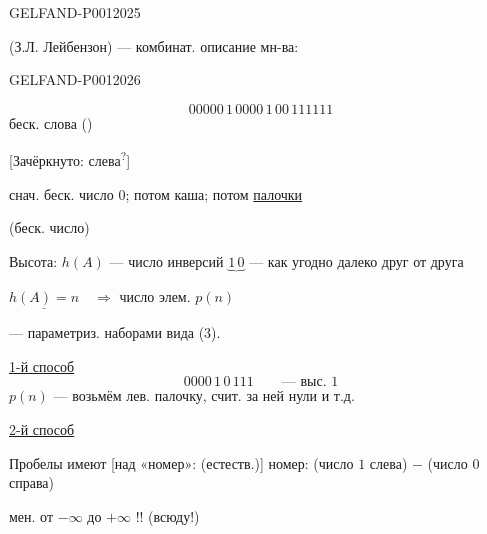 \begin{GelfandAdjacentEvidence}{GELFAND-P001202}{5}

(З.Л. Лейбензон) --- комбинат. описание мн-ва:
\end{GelfandAdjacentEvidence}
\begin{GelfandAdjacentEvidence}{GELFAND-P001202}{6}

\[
00000\,1\,0000\,1\,00\,111111
\]
беск. слова ()

[Зачёркнуто: слева\textsuperscript{?}]
\end{GelfandAdjacentEvidence}

снач. беск. число $0$; потом каша; потом \underline{палочки}

(беск. число)

Высота: $h(A)$ --- число инверсий $\underbrace{1\,0}$ --- как угодно далеко друг от друга

$\underline{h(A)=n}\quad\Rightarrow$ число элем. $p(n)$

--- параметриз. наборами вида (3).

\underline{1-й способ}
\[
0000\,1\,0\,111\qquad\text{--- выс. }1
\]
$p(n)$ --- возьмём лев. палочку, счит. за ней нули и т.д.

\underline{2-й способ}

Пробелы имеют [над «номер»: (естеств.)] номер:
(число $1$ слева) $-$ (число $0$ справа)

 мен. от $-\infty$ до $+\infty$ !! (всюду!)


